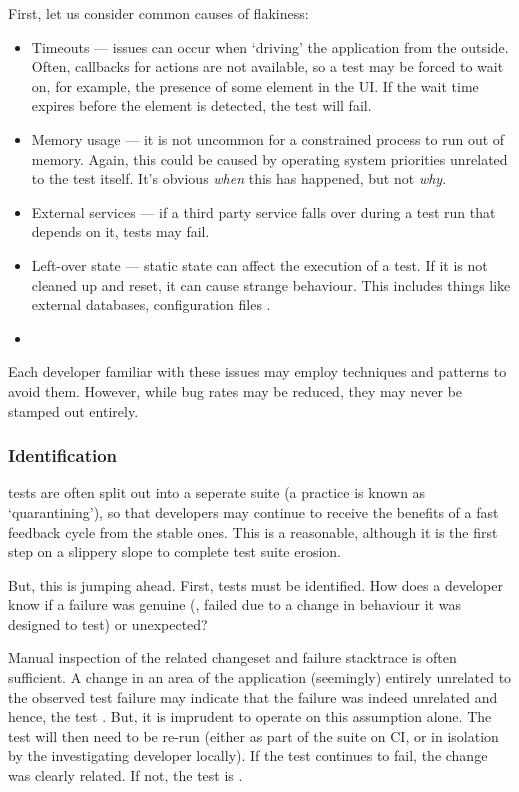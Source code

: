 First, let us consider common causes of flakiness:
\begin{itemize}
	\item Timeouts --- issues can occur when {\lq}driving{\rq} the application
	from the outside. Often, callbacks for actions are not available, so a test
	may be forced to wait on, for example, the presence of some element in the UI.
	If the wait time expires before the element is detected, the test will fail.
	\item Memory usage --- it is not uncommon for a constrained process to run out
	of memory. Again, this could be caused by operating system priorities
	unrelated to the test itself. It's obvious \textit{when} this has happened,
	but not \textit{why}.
	\item External services --- if a third party service falls over during a test
	run that depends on it, tests may fail.
	\item Left-over state --- static state can affect the execution of a test. If
	it is not cleaned up and reset, it can cause strange behaviour. This includes
	things like external databases, configuration files \etc.
	\item {}
\end{itemize}

Each developer familiar with these issues may employ techniques and patterns to
avoid them. However, while bug rates may be reduced, they may never be stamped
out entirely.

\subsubsection{Identification}

\flaky tests are often split out into a seperate suite (a practice is known as
{\lq}quarantining{\rq}), so that developers may continue to receive the benefits
of a fast feedback cycle from the stable ones. This is a reasonable, although
it is the first step on a slippery slope to complete test suite erosion.

But, this is jumping ahead. First, \flaky tests must be identified. How does a
developer know if a failure was genuine (\ie, failed due to a change in
behaviour it was designed to test) or unexpected?

Manual inspection of the related changeset and failure stacktrace is often
sufficient. A change in an area of the application (seemingly) entirely
unrelated to the observed test failure may indicate that the failure was indeed
unrelated and hence, the test \flaky. But, it is imprudent to operate on this
assumption alone. The test will then need to be re-run (either as part of the
suite on CI, or in isolation by the investigating developer locally). If the
test continues to fail, the change was clearly related. If not, the test is
\flaky.

